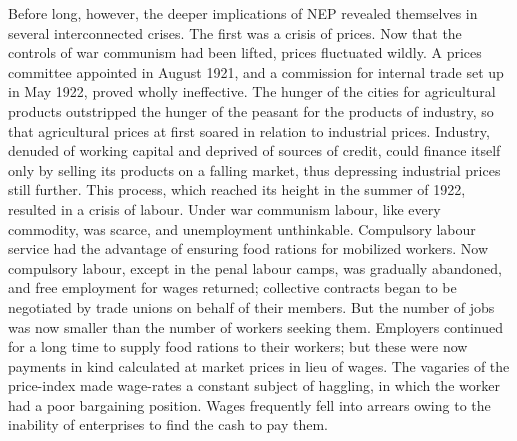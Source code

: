 Before long, however, the deeper implications of NEP revealed themselves in several interconnected crises. The first was a crisis of prices. Now that the controls of war communism had been lifted, prices fluctuated wildly. A prices committee appointed in August 1921, and a commission for internal trade set up in May 1922, proved wholly ineffective. The hunger of the cities for agricultural products outstripped the hunger of the peasant for the products of industry, so that agricultural prices at first soared in relation to industrial prices. Industry, denuded of working capital and deprived of sources of credit, could finance itself only by selling its products on a falling market, thus depressing industrial prices still further. This process, which reached its height in the summer of 1922, resulted in a crisis of labour. Under war communism labour, like every commodity, was scarce, and unemployment unthinkable. Compulsory labour service had the advantage of ensuring food rations for mobilized workers. Now compulsory labour, except in the penal labour camps, was gradually abandoned, and free employment for wages returned; collective contracts began to be negotiated by trade unions on behalf of their members. But the number of jobs was now smaller than the number of workers seeking them. Employers continued for a long time to supply food rations to their workers; but these were now payments in kind calculated at market prices in lieu of wages. The vagaries of the price-index made wage-rates a constant subject of haggling, in which the worker had a poor bargaining position. Wages frequently fell into arrears owing to the inability of enterprises to find the cash to pay them. 

